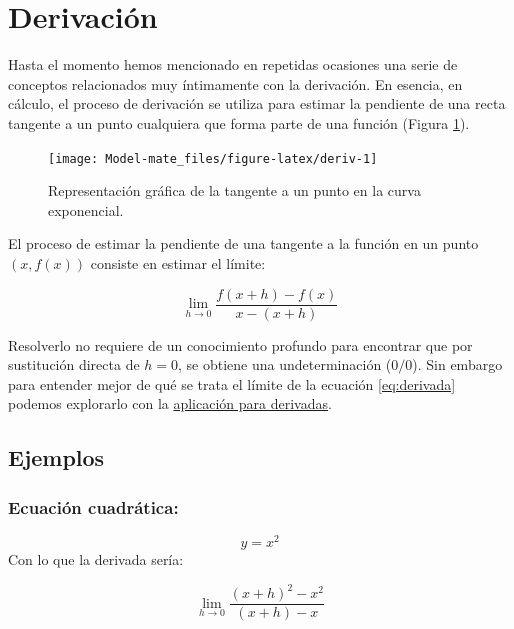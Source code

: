\documentclass[
]{book}
\begin{document}
\hypertarget{derivaciuxf3n}{%
\section{Derivación}\label{derivaciuxf3n}}

Hasta el momento hemos mencionado en repetidas ocasiones una serie de conceptos relacionados muy íntimamente con la derivación. En esencia, en cálculo, el proceso de derivación se utiliza para estimar la pendiente de una recta tangente a un punto cualquiera que forma parte de una función (Figura \ref{fig:deriv}).

\begin{figure}

{\centering \texttt{[image: Model-mate\_files/figure-latex/deriv-1]} 

}

\caption{Representación gráfica de la tangente a un punto en la curva exponencial.}\label{fig:deriv}
\end{figure}

El proceso de estimar la pendiente de una tangente a la función en un punto \((x, f(x))\) consiste en estimar el límite:

\begin{equation}
\lim \limits_{h \rightarrow 0} \frac{f(x + h) - f(x)}{x - (x + h)} \label{eq:derivada}
\end{equation}

Resolverlo no requiere de un conocimiento profundo para encontrar que por sustitución directa de \(h = 0\), se obtiene una undeterminación (\(0/0\)). Sin embargo para entender mejor de qué se trata el límite de la ecuación \eqref{eq:derivada} podemos explorarlo con la \href{https://www.geogebra.org/classic/rjttr8kq}{aplicación para derivadas}.

\hypertarget{ejemplos-1}{%
\subsection{Ejemplos}\label{ejemplos-1}}

\hypertarget{ecuaciuxf3n-cuadruxe1tica}{%
\subsubsection{Ecuación cuadrática:}\label{ecuaciuxf3n-cuadruxe1tica}}

\[ y = x^2\]
Con lo que la derivada sería:

\begin{equation}
\lim \limits_{h \rightarrow 0} \frac{(x + h)^2 - x^2}{(x+h) - x}
\end{equation}
\end{document}
